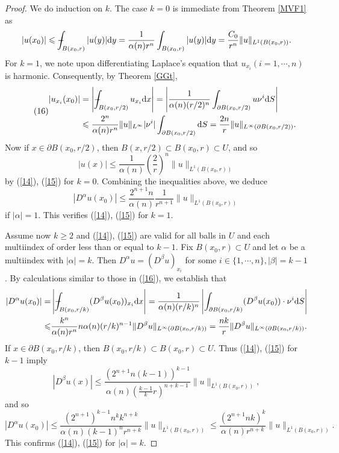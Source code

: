 \documentclass[hyperref,UTF8,12pt]{article}
\numberwithin{equation}{subsection}
\theoremstyle{plain}
\theoremstyle{definition}
\numberwithin{theorem}{section}
\numberwithin{lemma}{section}
\numberwithin{proposition}{section}
\numberwithin{remark}{section}
\numberwithin{corollary}{section}
\numberwithin{definition}{section}
\numberwithin{problem}{section}
\numberwithin{example}{section}
\def\dif{\textup{d}}
\def\Xint#1{\mathchoice
	{\XXint\displaystyle\textstyle{#1}}%
	{\XXint\textstyle\scriptstyle{#1}}%
	{\XXint\scriptstyle\scriptscriptstyle{#1}}%
	{\XXint\scriptscriptstyle\scriptscriptstyle{#1}}%
	\!\int}
\def\XXint#1#2#3{{\setbox0=\hbox{$#1{#2#3}{\int}$ }
		\vcenter{\hbox{$#2#3$ }}\kern-.55\wd0}}
\def\dashint{\Xint-}
\newcommand{\ptl}{\partial}
\renewcommand{\leq}{\leqslant}
\renewcommand{\geq}{\geqslant}
\begin{document}
\begin{proof}
We do induction on $k$. The case $k=0$ is immediate from Theorem \ref{MVF1} as \[|u(x_0)|\leq\dashint_{B(x_0,r)}|u(y)|\dif y=\frac{1}{\alpha(n)r^n}\int_{B(x_0,r)}|u(y)| \dif y=\frac{C_0}{r^n}\|u\|_{L^1(B(x_0,r))}.\] For $k=1$, we note upon differentiating Laplace's equation that $u_{x_i}(i=1,\cdots,n)$ is harmonic. Consequently, by Theorem \ref{GGt},\[\tag{16}\label{16}\begin{aligned}
	|u_{x_i}(x_0)|&=\left|\dashint_{B(x_0,r/2)}u_{x_i}\dif x\right|=\left|\frac{1}{\alpha(n)(r/2)^n}\int_{\ptl B(x_0,r/2)}u\nu^i\dif S\right|\\
	&\leq\frac{2^n}{\alpha(n)r^n}\|u\|_{L^\infty}|\nu^i|\int_{\ptl B(x_0,r/2)}\dif S=\frac{2n}{r}\|u\|_{L^\infty(\ptl B(x_0,r/2))}.
\end{aligned}\]Now if $x\in\ptl B(x_0,r/2)$, then $B(x,r/2)\subset B(x_0,r)\subset U$, and so\[|u(x)|\leq\frac{1}{\alpha(n)}\left(\frac{2}{r}\right)^n\|u\|_{L^1(B(x_0,r))}\] by (\ref{14}), (\ref{15}) for $k=0$. Combining the inequalities above, we deduce\[|D^\alpha
 u(x_0)|\leq\frac{2^{n+1}n}{\alpha(n)}\frac{1}{r^{n+1}}\|u\|_{L^1(B(x_0,r))}\]
if $|\alpha|=1$. This verifies (\ref{14}), (\ref{15}) for $k=1$.

Assume now $k\geq2$ and (\ref{14}), (\ref{15}) are valid for all balls in $U$ and each multiindex of order less than or equal to $k-1$. Fix $B(x_0,r)\subset U$ and let $\alpha$ be a multiindex with $|\alpha|=k$. Then $D^\alpha u=(D^\beta u)_{x_i}$ for some $i\in\{1, \cdots,n\},|\beta|=k-1$. By calculations similar to those in (\ref{16}), we establish that
\[\begin{aligned}
	|D^\alpha u(x_0)|=&\left|\dashint_{B(x_0,r/k)}(D^\beta u(x_0))_{x_i}\dif x\right|=\frac{1}{\alpha(n)(r/k)^n}\left|\int_{\ptl B(x_0,r/k)}(D^\beta u(x_0))\cdot\nu^i\dif S\right|\\
	\leq&\frac{k^n}{\alpha(n)r^n}n\alpha(n)(r/k)^{n-1}\|D^\beta u\|_{L^\infty(\ptl B(x_0,r/k))}=\frac{nk}{r}\|D^\beta u\|_{L^\infty(\ptl B(x_0,r/k))}.
\end{aligned}\]If $x\in\ptl B(x_0,r/k)$, then $B(x_0,r/k)\subset B(x_0,r)\subset U$. Thus (\ref{14}), (\ref{15}) for $k-1$ imply\[|D^\beta u(x)|\leq\frac{(2^{n+1}n(k-1))^{k-1}} {\alpha(n)\left(\frac{k-1}{k}r\right)^{n+k-1}}\|u\|_{L^1(B(x_0,r))},\]and so\[
|D^\alpha u(x_0)|\leq\frac{(2^{n+1})^{k-1}n^kk^{n+k}}{\alpha(n)(k-1)^nr^{n+k}}\|u\|_ {L^1(B(x_0,r))}\leq\frac{(2^{n+1}nk)^k}{\alpha(n)r^{n+k}}\|u\|_{L^1(B(x_0,r))}.\]This confirms (\ref{14}), (\ref{15}) for $|\alpha|=k$.
\end{proof}
\end{document}
